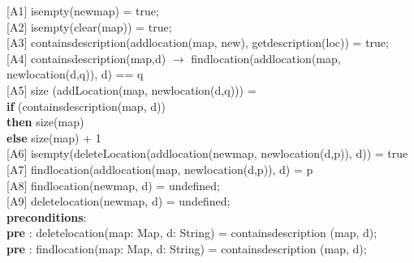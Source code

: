 \documentclass[12pt]{article}
\begin{document}
\begin{spacing}{1.5}
\hspace*{5mm} [A1] isempty(newmap) = true;\\
\hspace*{5mm} [A2] isempty(clear(map)) = true;\\
\hspace*{5mm} [A3] containsdescription(addlocation(map, new), getdescription(loc)) = true;\\
\hspace*{5mm} [A4] containsdescription(map,d) $\rightarrow$ findlocation(addlocation(map, newlocation(d,q)), d) \hspace*{15mm} == q \\
\hspace*{5mm} [A5] size (addLocation(map, newlocation(d,q))) = \\ \hspace*{15mm} \textbf{if} (containsdescription(map, d)) \\ \hspace*{25mm}\textbf{then} size(map) \\ \hspace*{15mm} \textbf{else} size(map) + 1\\
\hspace*{5mm} [A6] isempty(deleteLocation(addlocation(newmap, newlocation(d,p)), d)) = true \\
\hspace*{5mm} [A7] findlocation(addlocation(map, newlocation(d,p)), d) = p\\
\hspace*{5mm} [A8] findlocation(newmap, d) = undefined;\\
\hspace*{5mm} [A9] deletelocation(newmap, d) = undefined;\\
\hspace*{5mm} \textbf{preconditions}:\\
\hspace*{10mm} \textbf{pre} : deletelocation(map: Map, d: String) = containsdescription (map, d);\\
\hspace*{10mm} \textbf{pre} : findlocation(map: Map, d: String) = containsdescription (map, d);\\
\end{spacing}
\end{document}
